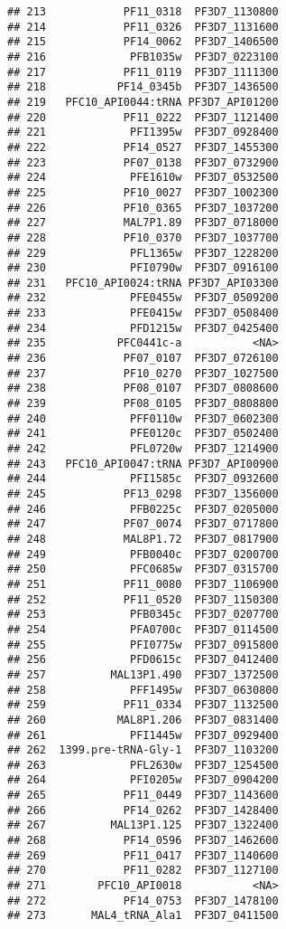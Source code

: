 \documentclass[12pt, a4paper]{article}\usepackage[]{graphicx}\usepackage[]{color}
\makeatletter
\newenvironment{kframe}{%
 \def\at@end@of@kframe{}%
 \ifinner\ifhmode%
  \def\at@end@of@kframe{\end{minipage}}%
  \begin{minipage}{\columnwidth}%
 \fi\fi%
 \def\FrameCommand##1{\hskip\@totalleftmargin \hskip-\fboxsep
 \colorbox{shadecolor}{##1}\hskip-\fboxsep
     \hskip-\linewidth \hskip-\@totalleftmargin \hskip\columnwidth}%
 \MakeFramed {\advance\hsize-\width
   \@totalleftmargin\z@ \linewidth\hsize
   \@setminipage}}%
 {\par\unskip\endMakeFramed%
 \at@end@of@kframe}
\newenvironment{knitrout}{}{} %
\makeatother
\begin{document}
\begin{knitrout}
\begin{kframe}
\begin{verbatim}
## 213            PF11_0318  PF3D7_1130800
## 214            PF11_0326  PF3D7_1131600
## 215            PF14_0062  PF3D7_1406500
## 216             PFB1035w  PF3D7_0223100
## 217            PF11_0119  PF3D7_1111300
## 218           PF14_0345b  PF3D7_1436500
## 219   PFC10_API0044:tRNA PF3D7_API01200
## 220            PF11_0222  PF3D7_1121400
## 221             PFI1395w  PF3D7_0928400
## 222            PF14_0527  PF3D7_1455300
## 223            PF07_0138  PF3D7_0732900
## 224             PFE1610w  PF3D7_0532500
## 225            PF10_0027  PF3D7_1002300
## 226            PF10_0365  PF3D7_1037200
## 227            MAL7P1.89  PF3D7_0718000
## 228            PF10_0370  PF3D7_1037700
## 229             PFL1365w  PF3D7_1228200
## 230             PFI0790w  PF3D7_0916100
## 231   PFC10_API0024:tRNA PF3D7_API03300
## 232             PFE0455w  PF3D7_0509200
## 233             PFE0415w  PF3D7_0508400
## 234             PFD1215w  PF3D7_0425400
## 235           PFC0441c-a           <NA>
## 236            PF07_0107  PF3D7_0726100
## 237            PF10_0270  PF3D7_1027500
## 238            PF08_0107  PF3D7_0808600
## 239            PF08_0105  PF3D7_0808800
## 240             PFF0110w  PF3D7_0602300
## 241             PFE0120c  PF3D7_0502400
## 242             PFL0720w  PF3D7_1214900
## 243   PFC10_API0047:tRNA PF3D7_API00900
## 244             PFI1585c  PF3D7_0932600
## 245            PF13_0298  PF3D7_1356000
## 246             PFB0225c  PF3D7_0205000
## 247            PF07_0074  PF3D7_0717800
## 248            MAL8P1.72  PF3D7_0817900
## 249             PFB0040c  PF3D7_0200700
## 250             PFC0685w  PF3D7_0315700
## 251            PF11_0080  PF3D7_1106900
## 252            PF11_0520  PF3D7_1150300
## 253             PFB0345c  PF3D7_0207700
## 254             PFA0700c  PF3D7_0114500
## 255             PFI0775w  PF3D7_0915800
## 256             PFD0615c  PF3D7_0412400
## 257          MAL13P1.490  PF3D7_1372500
## 258             PFF1495w  PF3D7_0630800
## 259            PF11_0334  PF3D7_1132500
## 260           MAL8P1.206  PF3D7_0831400
## 261             PFI1445w  PF3D7_0929400
## 262  1399.pre-tRNA-Gly-1  PF3D7_1103200
## 263             PFL2630w  PF3D7_1254500
## 264             PFI0205w  PF3D7_0904200
## 265            PF11_0449  PF3D7_1143600
## 266            PF14_0262  PF3D7_1428400
## 267          MAL13P1.125  PF3D7_1322400
## 268            PF14_0596  PF3D7_1462600
## 269            PF11_0417  PF3D7_1140600
## 270            PF11_0282  PF3D7_1127100
## 271        PFC10_API0018           <NA>
## 272            PF14_0753  PF3D7_1478100
## 273       MAL4_tRNA_Ala1  PF3D7_0411500

\end{verbatim}
\end{kframe}
\end{knitrout}
\end{document}
